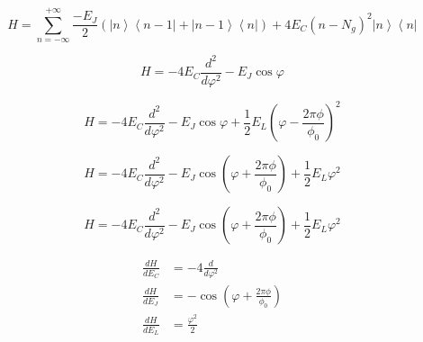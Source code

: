 \documentclass[12pt]{article}
\title{}
\author{John O'Connor}
\date{}
\newcommand{\bra}[1]{\left< #1 \right|}
\newcommand{\ket}[1]{\left| #1 \right>}
\begin{document}
\[ H = \sum_{n=-\infty}^{+\infty} \frac{-E_J}{2}\left( \ket{n}\bra{n-1}
 + \ket{n-1}\bra{n} \right) + 4E_C(n-N_g)^2\ket{n}\bra{n}\]

\[ H = -4E_C\frac{d^2}{d\varphi^2}-E_J\cos{\varphi} \]

\[ H = -4E_C\frac{d^2}{d\varphi^2}-E_J\cos{\varphi}+\frac{1}{2}
E_L\left(\varphi-\frac{2\pi\phi}{\phi_0} \right)^2 \]

\[ H = -4E_C\frac{d^2}{d\varphi^2}-E_J\cos\left(\varphi+
\frac{2\pi\phi}{\phi_0}\right)+
\frac{1}{2} E_L\varphi^2 \]

\[ H = -4E_C\frac{d^2}{d\varphi^2}-E_J\cos\left(\varphi+
\frac{2\pi\phi}{\phi_0}\right)+
\frac{1}{2} E_L\varphi^2 \]

\begin{align*}
  \frac{dH}{dE_C} &= -4\frac{d}{d\varphi^2}\\
  \frac{dH}{dE_J} &= -\cos(\varphi + \frac{2\pi\phi}{\phi_0}) \\
  \frac{dH}{dE_L} &= \frac{\varphi^2}{2}
\end{align*}
\end{document}
